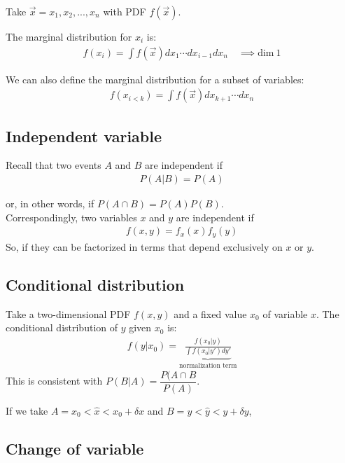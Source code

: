 Take $\vec{x} = x_1, x_2, ..., x_n$ with PDF $f(\vec{x})$.

The marginal distribution for $x_i$ is:
\begin{align}
    f(x_i) = \int f(\vec{x}) dx_1 \cdots dx_{i-1} dx_{n} \quad \implies \text{dim} \ 1 
\end{align}

We can also define the marginal distribution for a subset of variables: 
\begin{align}
    f(x_{i < k}) = \int f(\vec{x}) dx_{k+1} \cdots dx_{n}
\end{align}

\subsection{Independent variable}
\label{subsec:independent_var}
Recall that two events $A$ and $B$ are independent if 
\begin{align}
    P(A|B) = P(A)
\end{align}

or, in other words, if $P(A \cap B) = P(A)P(B)$.\\

Correspondingly, two variables $x$ and $y$ are independent if 
\begin{align}
    f(x,y) = f_x(x) f_y(y)
\end{align}
So, if they can be factorized in terms that depend exclusively on $x$ or $y$.

\subsection{Conditional distribution}
\label{subsec:cond_distr}
Take a two-dimensional PDF $f(x,y)$ and a fixed value $x_0$ of variable $x$.
The conditional distribution of $y$ given $x_0$ is:
\begin{align}
    f(y|x_0) = \underset{\text{normalization term}}{\underbrace{\frac{f(x_0|y)}{\int f(x_0|y')dy'}}}    
\end{align}     
This is consistent with $P(B|A) = \dfrac{P(A\cap B}{P(A)}$.

If we take $A = x_0 < \hat{x} < x_0 + \delta x$ and $B = y < \hat{y} < y+\delta y$,

\subsection{Change of variable}
\label{subsec:change_of_var}

